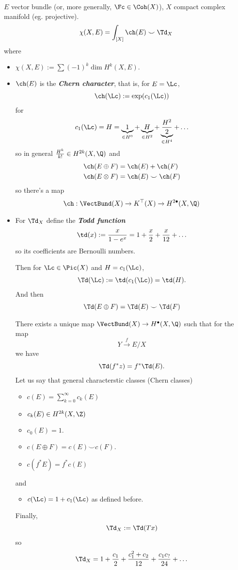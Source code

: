 \begin{thm}
	$E$ vector bundle (or, more generally, $\Fc\in\Coh(X)$), $X$ compact complex manifold (eg. projective).
	\[\chi(X,E)=\int_{[X]}\ch(E)\smile \Td_X\]
	where
	\begin{itemize}
		\item $\chi(X,E):=\sum(-1)^k\dim H^k(X,E)$.
		\item $\ch(E)$ is the \textbf{\textit{Chern character}}, that is, for $E=\Lc$,
		\[\ch(\Lc):=\exp(c_1(\Lc))\]
		for
		\[c_1(\Lc)=H=\underbrace{1}_{\in H^0}+\underbrace{H}_{\in H^2}+\underbrace{\frac{H^2}{2}}_{\in H^4}+\ldots\]
		so in general $\frac{H^k}{k!}\in H^{2k}(X,\Q)$ and
		\begin{align*}
			\ch(E\oplus F)&=\ch(E)+\ch(F)\\
			\ch(E\otimes F)&=\ch(E)\smile\ch(F)
		\end{align*}
		so there's a map
		\[\ch:\VectBund(X)\to K^{\top}(X)\to H^{2\bullet}(X,\Q)\]
		\item For $\Td_X$ define the \textbf{\textit{Todd function}}
		\[\td(x):=\frac{x}{1-e^x}=1+\frac{x}{2}+\frac{x}{12}+\ldots\]
		so its coefficients are Bernoulli numbers.
		
		Then for $\Lc\in\Pic(X)$ and $H=c_1(\Lc)$,
		\[\Td(\Lc):=\td(c_1(\Lc))=\td(H).\]
		And then
		\[\Td(E\oplus F)=\Td(E)\smile\Td(F)\]
		\begin{claim}
			There exists a unique map $\VectBund(X)\to H^{\bullet}(X,\Q)$ such that for the map
			\[Y\overset{f}{\to}E/X\]
			we have
			\[\Td(f^*z)=f^*\Td(E).\]
			Let us say that general characterstic classes (Chern classes)
			\begin{itemize}[label=$\circ$]
				\item $c(E)=\sum_{k=0}^\infty c_k(E)$
				\item $c_k(E)\in H^{2k}(X,\Z)$
				\item $c_0(E)=1$.
				\item $c(E\oplus F)=c(E)\smile c(F)$.
				\item $c(f^*E)=f^*c(E)$
			\end{itemize}
			and
			\begin{itemize}[label=$\circ$]
				\item $c(\Lc)=1+c_1(\Lc)$ as defined before.
			\end{itemize}
			Finally,
			\[\Td_X:=\Td(Tx)\]
			so
			\[\Td_X=1+\frac{c_1}{2}+\frac{c_1^2+c_2}{12}+\frac{c_1c_?}{24}+\ldots\]
		\end{claim}
	\end{itemize}
\end{thm}
